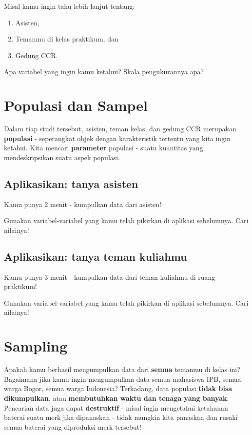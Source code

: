 \documentclass[
  letterpaper,
  DIV=11,
  numbers=noendperiod]{scrreprt}
\providecommand{\tightlist}{%
  \setlength{\itemsep}{0pt}\setlength{\parskip}{0pt}}\usepackage{longtable,booktabs,array}
\begin{document}
Misal kamu ingin tahu lebih lanjut tentang:

\begin{enumerate}
\def\labelenumi{\arabic{enumi}.}
\tightlist
\item
  Asisten,
\item
  Temanmu di kelas praktikum, dan
\item
  Gedung CCR.
\end{enumerate}

Apa variabel yang ingin kamu ketahui? Skala pengukurannya apa?

\hypertarget{populasi-dan-sampel}{%
\section{Populasi dan Sampel}\label{populasi-dan-sampel}}

Dalam tiap studi tersebut, asisten, teman kelas, dan gedung CCR
merupakan \textbf{populasi} - seperangkat objek dengan karakteristik
tertentu yang kita ingin ketahui. Kita mencari \textbf{parameter}
populasi - suatu kuantitas yang mendeskripsikan suatu aspek populasi.

\hypertarget{aplikasikan-tanya-asisten}{%
\subsection{Aplikasikan: tanya
asisten}\label{aplikasikan-tanya-asisten}}

Kamu punya 2 menit - kumpulkan data dari asisten!

Gunakan variabel-variabel yang kamu telah pikirkan di aplikasi
sebelumnya. Cari nilainya!

\hypertarget{aplikasikan-tanya-teman-kuliahmu}{%
\subsection{Aplikasikan: tanya teman
kuliahmu}\label{aplikasikan-tanya-teman-kuliahmu}}

Kamu punya 3 menit - kumpulkan data dari teman kuliahmu di ruang
praktikum!

Gunakan variabel-variabel yang kamu telah pikirkan di aplikasi
sebelumnya. Cari nilainya!

\hypertarget{sampling}{%
\section{Sampling}\label{sampling}}

Apakah kamu berhasil mengumpulkan data dari \textbf{semua} temanmu di
kelas ini? Bagaimana jika kamu ingin mengumpulkan data semua mahasiswa
IPB, semua warga Bogor, semua warga Indonesia? Terkadang, data populasi
\textbf{tidak bisa dikumpulkan}, atau \textbf{membutuhkan waktu dan
tenaga yang banyak}. Pencarian data juga dapat \textbf{destruktif} -
misal ingin mengetahui ketahanan baterai suatu merk jika dipanaskan -
tidak mungkin kita panaskan dan rusaki semua baterai yang diproduksi
merk tersebut!
\end{document}
